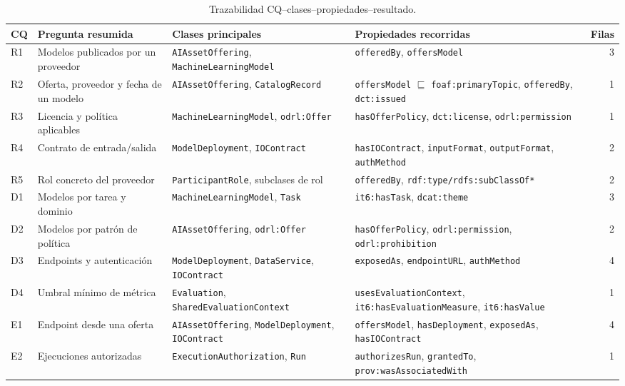 \documentclass[Afour,sagev,times]{sagej}
\newcommand{\code}[1]{\texttt{#1}}
\begin{document}
\begin{table}[tb]
\scriptsize\sf\centering
\caption{Trazabilidad CQ--clases--propiedades--resultado.\label{tab:cq-trace}}
\begin{tabular}{@{}p{0.8cm}p{3.8cm}p{4.0cm}p{4.9cm}r@{}}
\toprule
\textbf{CQ} & \textbf{Pregunta resumida} & \textbf{Clases principales} & \textbf{Propiedades recorridas} & \textbf{Filas} \\
\midrule
R1 & Modelos publicados por un proveedor & \code{AIAssetOffering}, \code{MachineLearningModel} & \code{offeredBy}, \code{offersModel} & 3 \\
R2 & Oferta, proveedor y fecha de un modelo & \code{AIAssetOffering}, \code{CatalogRecord} & \code{offersModel} $\sqsubseteq$ \code{foaf:primaryTopic}, \code{offeredBy}, \code{dct:issued} & 1 \\
R3 & Licencia y política aplicables & \code{MachineLearningModel}, \code{odrl:Offer} & \code{hasOfferPolicy}, \code{dct:license}, \code{odrl:permission} & 1 \\
R4 & Contrato de entrada/salida & \code{ModelDeployment}, \code{IOContract} & \code{hasIOContract}, \code{inputFormat}, \code{outputFormat}, \code{authMethod} & 2 \\
R5 & Rol concreto del proveedor & \code{ParticipantRole}, subclases de rol & \code{offeredBy}, \code{rdf:type/}\newline\code{rdfs:subClassOf*} & 2 \\
D1 & Modelos por tarea y dominio & \code{MachineLearningModel}, \code{Task} & \code{it6:hasTask}, \code{dcat:theme} & 3 \\
D2 & Modelos por patrón de política & \code{AIAssetOffering}, \code{odrl:Offer} & \code{hasOfferPolicy}, \code{odrl:permission}, \code{odrl:prohibition} & 2 \\
D3 & Endpoints y autenticación & \code{ModelDeployment}, \code{DataService}, \code{IOContract} & \code{exposedAs}, \code{endpointURL}, \code{authMethod} & 4 \\
D4 & Umbral mínimo de métrica & \code{Evaluation}, \code{SharedEvaluationContext} & \code{usesEvaluationContext}, \code{it6:hasEvaluationMeasure}, \code{it6:hasValue} & 1 \\
E1 & Endpoint desde una oferta & \code{AIAssetOffering}, \code{ModelDeployment}, \code{IOContract} & \code{offersModel}, \code{hasDeployment}, \code{exposedAs}, \code{hasIOContract} & 4 \\
E2 & Ejecuciones autorizadas & \code{ExecutionAuthorization}, \code{Run} & \code{authorizesRun}, \code{grantedTo}, \code{prov:wasAssociatedWith} & 1 \\

\end{tabular}
\end{table}
\end{document}
